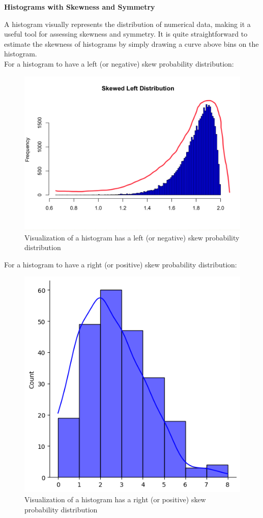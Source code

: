 \textbf{Histograms with Skewness and Symmetry}

A histogram visually represents the distribution of numerical data, making it a useful tool for assessing skewness and symmetry. It is quite straightforward to estimate the skewness of histograms by simply drawing a curve above bins on the histogram.\\

For a histogram to have a left (or negative) skew probability distribution:

\begin{figure}[H]
 \centering
 \includegraphics[scale=0.25]{Section1/img/HisL.jpg}
 \caption{Visualization of a histogram has a left (or negative) skew probability distribution}
\end{figure} 

For a histogram to have a right (or positive) skew probability distribution:

\begin{figure}[H]
 \centering
 \includegraphics[scale=0.25]{Section1/img/HisR.jpg}
 \caption{Visualization of a histogram has a right (or positive) skew probability distribution}
\end{figure} 

